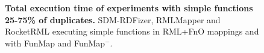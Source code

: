 \begin{figure}[t!]
{            \label{fig:vera25_rocketrml}}
\caption{{\bf Total execution time of experiments with simple functions 25-75\% of duplicates.} SDM-RDFizer, RMLMapper and RocketRML executing simple functions in RML+FnO mappings and with FunMap and FunMap$^-$.}
    \label{fig:exp-simple}
\end{figure}

